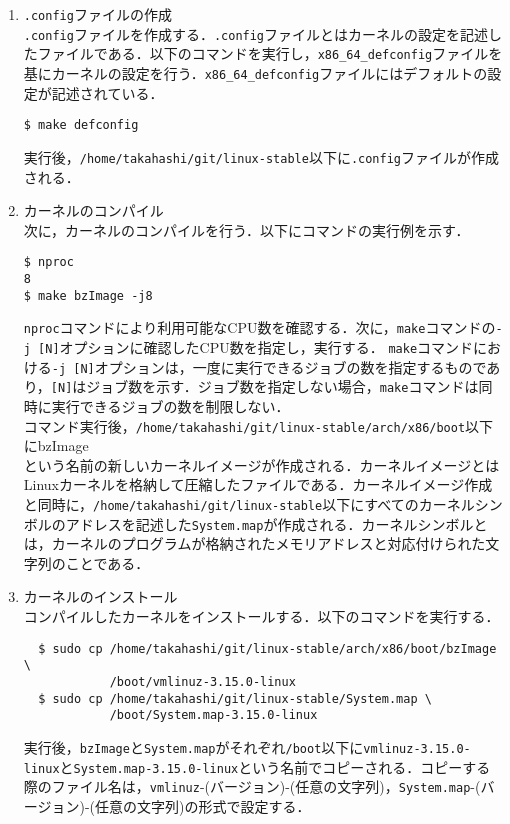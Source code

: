\documentclass[12pt]{jsarticle}
\begin{document}
\begin{enumerate}
\item \verb|.config|ファイルの作成 \\
\verb|.config|ファイルを作成する．\verb|.config|ファイルとはカーネルの設定を記述したファイルである．以下のコマンドを実行し，\verb|x86_64_defconfig|ファイルを基にカーネルの設定を行う．\verb|x86_64_defconfig|ファイルにはデフォルトの設定が記述されている．

\begin{verbatim}
$ make defconfig
\end{verbatim}
実行後，\verb|/home/takahashi/git/linux-stable|以下に\verb|.config|ファイルが作成される．

\item カーネルのコンパイル \\
次に，カーネルのコンパイルを行う．以下にコマンドの実行例を示す．

\begin{verbatim}
$ nproc
8
$ make bzImage -j8
\end{verbatim}
\verb|nproc|コマンドにより利用可能なCPU数を確認する．次に，\verb|make|コマンドの\verb|-j [N]|オプションに確認したCPU数を指定し，実行する．
\verb|make|コマンドにおける\verb|-j [N]|オプションは，一度に実行できるジョブの数を指定するものであり，\verb|[N]|はジョブ数を示す．ジョブ数を指定しない場合，\verb|make|コマンドは同時に実行できるジョブの数を制限しない．\\
コマンド実行後，\verb|/home/takahashi/git/linux-stable/arch/x86/boot|以下にbzImage\\
という名前の新しいカーネルイメージが作成される．カーネルイメージとはLinuxカーネルを格納して圧縮したファイルである．カーネルイメージ作成と同時に，\verb|/home/takahashi/git/linux-stable|以下にすべてのカーネルシンボルのアドレスを記述した\verb|System.map|が作成される．カーネルシンボルとは，カーネルのプログラムが格納されたメモリアドレスと対応付けられた文字列のことである．

\item カーネルのインストール \\
  コンパイルしたカーネルをインストールする．以下のコマンドを実行する．
\begin{verbatim}
  $ sudo cp /home/takahashi/git/linux-stable/arch/x86/boot/bzImage \
            /boot/vmlinuz-3.15.0-linux
  $ sudo cp /home/takahashi/git/linux-stable/System.map \
            /boot/System.map-3.15.0-linux
\end{verbatim}
実行後，\verb|bzImage|と\verb|System.map|がそれぞれ\verb|/boot|以下に\verb|vmlinuz-3.15.0-linux|と\verb|System.map-3.15.0-linux|という名前でコピーされる．コピーする際のファイル名は，\verb|vmlinuz|-(バージョン)-(任意の文字列)，\verb|System.map|-(バージョン)-(任意の文字列)の形式で設定する．


\end{enumerate}
\end{document}
